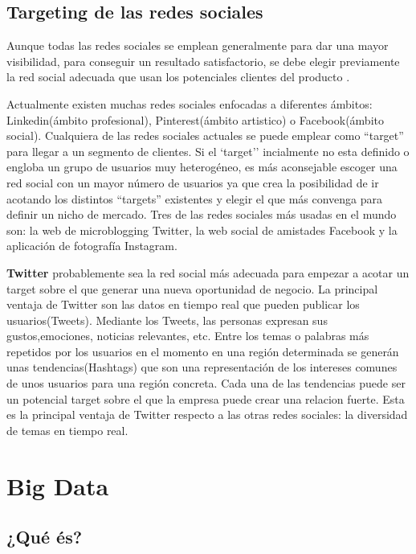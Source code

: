 \subsection{Targeting de las redes sociales}

Aunque todas las redes sociales se emplean generalmente para dar una mayor visibilidad, para conseguir un resultado satisfactorio, se debe elegir previamente la red social adecuada que usan los potenciales clientes del producto \cite{social-targetting}.

\vspace{5 mm}

Actualmente existen muchas redes sociales enfocadas a diferentes ámbitos: Linkedin(ámbito profesional), Pinterest(ámbito artistico) o Facebook(ámbito social). Cualquiera de las redes sociales actuales se puede emplear como ``target'' para llegar a un segmento de clientes. Si el `target'' incialmente no esta definido o engloba un grupo de usuarios muy heterogéneo, es más aconsejable escoger una red social con  un mayor número de usuarios ya que crea la posibilidad de ir acotando los distintos ``targets'' existentes y elegir el que más convenga para definir un nicho de mercado. Tres de las redes sociales más usadas en el mundo son: la web de microblogging Twitter, la web social de amistades Facebook y la aplicación de fotografía Instagram.

\vspace{5 mm}

\textbf{Twitter} probablemente sea la red social más adecuada para empezar a acotar un target sobre el que generar una nueva oportunidad de negocio. La principal ventaja de Twitter son las datos en tiempo real que pueden publicar los usuarios(Tweets). Mediante los Tweets, las personas expresan sus gustos,emociones, noticias relevantes, etc. Entre los temas o palabras más repetidos por los usuarios en el momento en una región determinada se generán unas tendencias(Hashtags) que son una representación de los intereses comunes de unos usuarios para una región concreta. Cada una de las tendencias puede ser un potencial target sobre el que la empresa puede crear una relacion fuerte. Esta es la principal ventaja de Twitter respecto a las otras redes sociales: la diversidad de temas en tiempo real.

\section{Big Data}

\subsection{¿Qué és?}

